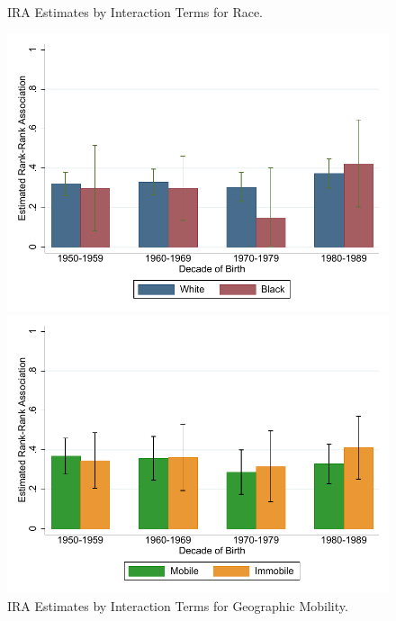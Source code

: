 \documentclass[notitlepage,12pt]{article}
\begin{document}
\begin{figure}
\centering
\begin{minipage}{.47\textwidth}
  \centering
  \caption{IRA Estimates by Interaction Terms for Race.}
  \includegraphics[width=\textwidth]{Graph11.pdf}
  \end{minipage}
\begin{minipage}{.47\textwidth}
  \centering
  \caption{IRA Estimates by Interaction Terms for Geographic Mobility.}
  \includegraphics[width=\textwidth]{Graph12.pdf}
  \end{minipage}
\end{figure}
\end{document}
